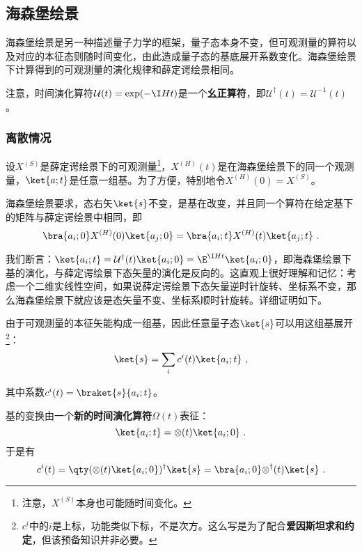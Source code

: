 \subsection{海森堡绘景}

海森堡绘景是另一种描述量子力学的框架，量子态本身不变，但可观测量的算符以及对应的本征态则随时间变化，由此造成量子态的基底展开系数变化。海森堡绘景下计算得到的可观测量的演化规律和薛定谔绘景相同。

注意，时间演化算符$\mathcal{U}(t)=\exp(-\I Ht)$是一个\textbf{幺正算符}，即$\mathcal{U}^\dagger(t)=\mathcal{U}^{-1}(t)$。

\subsubsection{离散情况}



设$X^{(S)}$是薛定谔绘景下的可观测量\footnote{注意，$X^{(S)}$本身也可能随时间变化。}，$X^{(H)}(t)$是在海森堡绘景下的同一个观测量，$\ket{a; t}$是任意一组基。为了方便，特别地令$X^{(H)}(0)=X^{(S)}$。


海森堡绘景要求，态右矢$\ket{s}$不变，是基在改变，并且同一个算符在给定基下的矩阵与薛定谔绘景中相同，即
\begin{equation}\label{eq_HsbPic_16}
\bra{a_i; 0}X^{(H)}(0)\ket{a_j; 0} = \bra{a_i; t}X^{(H)}(t)\ket{a_j; t}~.
\end{equation}

我们断言：$\ket{a_i; t} = \mathcal{U}^\dagger(t)\ket{a_i; 0} = \E^{\I H t}\ket{a_i; 0}$，即海森堡绘景下基的演化，与薛定谔绘景下态矢量的演化是反向的。这直观上很好理解和记忆：考虑一个二维实线性空间，如果说薛定谔绘景下态矢量逆时针旋转、坐标系不变，那么海森堡绘景下就应该是态矢量不变、坐标系顺时针旋转。详细证明如下。

由于可观测量的本征矢能构成一组基，因此任意量子态$\ket{s}$可以用这组基展开\footnote{$c^i$中的$i$是上标，功能类似下标，不是次方。这么写是为了配合\textbf{爱因斯坦求和约定}，但该预备知识并非必要。}：
\begin{equation}\label{eq_HsbPic_12}
\ket{s} = \sum_i c^i(t)\ket{a_i; t}~,
\end{equation}

其中系数$c^i(t)=\braket{s}{a_i; t}$。


基的变换由一个\textbf{新的时间演化算符}$\mathcal{\Omega}(t)$表征：
\begin{equation}\label{eq_HsbPic_13}
\ket{a_i; t} = \mathcal{\Omega}(t)\ket{a_i; 0}~.
\end{equation}
于是有
\begin{equation}\label{eq_HsbPic_14}
c^i(t) = \qty(\mathcal{\Omega}(t)\ket{a_i; 0})^\dagger\ket{s} = \bra{a_i; 0}\mathcal{\Omega}^\dagger(t)\ket{s}~.
\end{equation}

